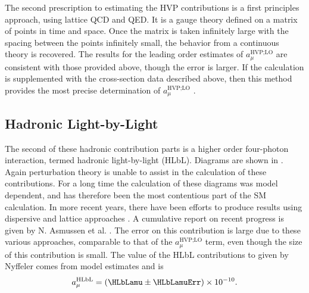 The second prescription to estimating the HVP contributions is a first principles approach, using lattice QCD and QED. It is a gauge theory defined on a matrix of points in time and space. Once the matrix is taken infinitely large with the spacing between the points infinitely small, the behavior from a continuous theory is recovered. The results for the leading order estimates of $a_{\mu}^{\text{HVP;LO}}$ are consistent with those provided above, though the error is larger. If the calculation is supplemented with the cross-section data described above, then this method provides the most precise determination of $a_{\mu}^{\text{HVP;LO}}$ \cite{Lattice}.



\subsection*{Hadronic Light-by-Light}
\label{subsec:HLbL}

The second of these hadronic contribution parts is a higher order four-photon interaction, termed hadronic light-by-light (HLbL). Diagrams are shown in . Again perturbation theory is unable to assist in the calculation of these contributions. For a long time the calculation of these diagrams was model dependent, and has therefore been the most contentious part of the SM calculation. In more recent years, there have been efforts to produce results using dispersive \cite{Colangelo:2014dfa,Colangelo:2015ama,Colangelo:2017qdm} and lattice approaches \cite{Blum:2015gfa,Blum:2016lnc,Blum:2017cer}. A cumulative report on recent progress is given by N. Asmussen et al. \cite{HLbL1}. The error on this contribution is large due to these various approaches, comparable to that of the $a_{\mu}^{\text{HVP;LO}}$ term, even though the size of this contribution is small. The value of the HLbL contributions to \amu given by Nyffeler \cite{Nyffeler:2016gnb} comes from model estimates and is 
		\begin{align}
            a_{\mu}^{\text{HLbL}} = (\HLbLamu \pm \HLbLamuErr) \times 10^{-10}.
		\end{align}


